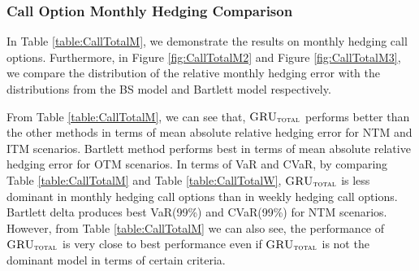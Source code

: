 \documentclass[letterpaper,12pt,titlepage,oneside,final]{book}
\numberwithin{equation}{section}
\theoremstyle{definition}
\newcommand{\modelT}{\textsc{GRU}_{\textsc{total}}}
\begin{document}
\subsubsection{Call Option Monthly Hedging Comparison}
In Table \ref{table:CallTotalM}, we demonstrate the results on monthly hedging call options. Furthermore, in Figure \ref{fig:CallTotalM2} and  Figure \ref{fig:CallTotalM3}, we compare the distribution of the relative monthly hedging error with the distributions from the BS model and Bartlett model respectively.

From Table \ref{table:CallTotalM}, we can see that, $\modelT$ performs better than the other  methods in terms of 
mean absolute relative hedging error for NTM and ITM scenarios. Bartlett method performs best in terms of 
mean absolute relative hedging error for OTM scenarios. In terms of VaR and CVaR, by comparing Table \ref{table:CallTotalM} and Table \ref{table:CallTotalW}, $\modelT$ is less dominant  in monthly hedging call options than in weekly hedging call options.  Bartlett delta produces best VaR(99\%) and CVaR(99\%) for NTM scenarios. However, from Table \ref{table:CallTotalM} we can also see, the performance of $\modelT$ is  very close to best performance even if  $\modelT$ is not the dominant model in terms of certain criteria.
\end{document}
